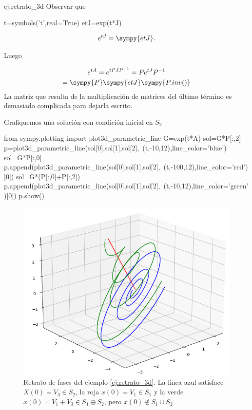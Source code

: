 \begin{ejemplo}{ej:retrato_3d}
 Observar que
 \begin{sympycode}
t=symbols('t',real=True)
etJ=exp(t*J)
 \end{sympycode}

 
 \[
  e^{tJ}=\sympy{etJ}.
 \]

 Luego

 \begin{multline*}
  e^{tA}=e^{tPJP^{-1}}=Pe^{tJ}P^{-1}\\
  =\sympy{P}\sympy{etJ}\sympy{P.inv()}\\
 \end{multline*}
La matriz que resulta de la multiplicación de matrices del último término es demasiado complicada para dejarla escrito. 

Grafiquemos una solución con condición inicial en $S_2$

\begin{sympyverbatim}
from sympy.plotting import plot3d_parametric_line
G=exp(t*A)
sol=G*P[:,2]
p=plot3d_parametric_line(sol[0],sol[1],sol[2],\
    (t,-10,12),line_color='blue')
sol=G*P[:,0]
p.append(plot3d_parametric_line(sol[0],sol[1],sol[2],\
    (t,-100,12),line_color='red')[0])
sol=G*(P[:,0]+P[:,2])
p.append(plot3d_parametric_line(sol[0],sol[1],sol[2],\
    (t,-10,12),line_color='green')[0])
p.show()
\end{sympyverbatim}



\begin{figure}[h]
\begin{center}
\includegraphics[scale=.5]{imagenes/retrato_3d.png}
\end{center}
\caption{Retrato de fases del ejemplo \ref{ej:retrato_3d}. La linea azul satisface $X(0)=V_3\in S_2$, la roja $x(0)=V_1\in S_1$ y la verde $x(0)=V_1+V_3\in S_1\oplus S_2$, pero $x(0)\notin S_1\cup S_2$}\label{fig:centro}
\end{figure}



 
\end{ejemplo}

